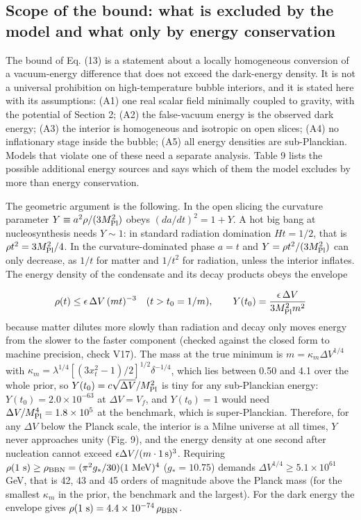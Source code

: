 \documentclass[11pt,a4paper]{article}
\begin{document}
\subsection{Scope of the bound: what is excluded by the model and what only by energy conservation}
The bound of Eq. (13) is a statement about a locally homogeneous conversion of a vacuum-energy difference that does not exceed the dark-energy density. It is not a universal prohibition on high-temperature bubble interiors, and it is stated here with its assumptions: (A1) one real scalar field minimally coupled to gravity, with the potential of Section 2; (A2) the false-vacuum energy is the observed dark energy; (A3) the interior is homogeneous and isotropic on open slices; (A4) no inflationary stage inside the bubble; (A5) all energy densities are sub-Planckian. Models that violate one of these need a separate analysis. Table 9 lists the possible additional energy sources and says which of them the model excludes by more than energy conservation.

The geometric argument is the following. In the open slicing the curvature parameter $Y\equiv a^2\rho/(3M_{\rm Pl}^2)$ obeys $(da/dt)^2=1+Y$. A hot big bang at nucleosynthesis needs $Y\sim1$: in standard radiation domination $Ht=1/2$, that is $\rho t^2=3M_{\rm Pl}^2/4$. In the curvature-dominated phase $a=t$ and $Y=\rho t^2/(3M_{\rm Pl}^2)$ can only decrease, as $1/t$ for matter and $1/t^2$ for radiation, unless the interior inflates. The energy density of the condensate and its decay products obeys the envelope

\begin{equation}
\rho(t)\le\epsilon\,\Delta V\,(mt)^{-3}\quad(t>t_0=1/m),\qquad Y(t_0)=\frac{\epsilon\,\Delta V}{3M_{\rm Pl}^2m^2}
\end{equation}
because matter dilutes more slowly than radiation and decay only moves energy from the slower to the faster component (checked against the closed form to machine precision, check V17). The mass at the true minimum is $m=\kappa_m\Delta V^{1/4}$ with $\kappa_m=\lambda^{1/4}[(3x_t^2-1)/2]^{1/2}\delta^{-1/4}$, which lies between 0.50 and 4.1 over the whole prior, so $Y(t_0)=c\sqrt{\Delta V}/M_{\rm Pl}^2$ is tiny for any sub-Planckian energy: $Y(t_0)=2.0\times10^{-63}$ at $\Delta V=V_f$, and $Y(t_0)=1$ would need $\Delta V/M_{\rm Pl}^4=1.8\times10^{5}$ at the benchmark, which is super-Planckian. Therefore, for any $\Delta V$ below the Planck scale, the interior is a Milne universe at all times, $Y$ never approaches unity (Fig. 9), and the energy density at one second after nucleation cannot exceed $\epsilon\Delta V/(m\cdot1\,{\rm s})^3$. Requiring $\rho(1\ {\rm s})\ge\rho_{\rm BBN}=(\pi^2g_*/30)(1\ {\rm MeV})^4$ ($g_*=10.75$) demands $\Delta V^{1/4}\ge5.1\times10^{61}$ GeV, that is 42, 43 and 45 orders of magnitude above the Planck mass (for the smallest $\kappa_m$ in the prior, the benchmark and the largest). For the dark energy the envelope gives $\rho(1\ {\rm s})=4.4\times10^{-74}\,\rho_{\rm BBN}$.
\end{document}
